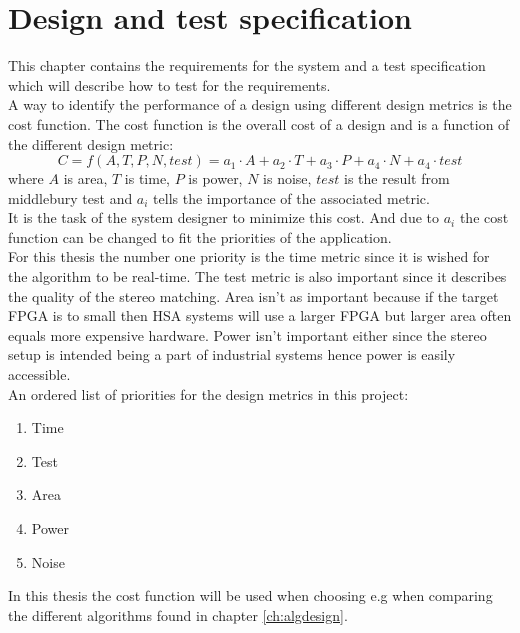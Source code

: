 \chapter{Design and test specification} \label{ch:req}
This chapter contains the requirements for the system and a test specification which will describe how to test for the requirements.\\

A way to identify the performance of a design using different design metrics is the cost function. The cost function is the overall cost of a design and is a function of the different design metric:
\begin{equation}
C = f(A,T,P,N,test) = a_1\cdot A + a_2 \cdot T + a_3 \cdot P + a_4 \cdot N + a_4 \cdot test
\end{equation}
where $A$ is area, $T$ is time, $P$ is power, $N$ is noise, $test$ is the result from middlebury test and $a_i$ tells the importance of the associated metric.\\
It is the task of the system designer to minimize this cost. And due to $a_i$ the cost function can be changed to fit the priorities of the application.\\

For this thesis the number one priority is the time metric since it is wished for the algorithm to be real-time. The test metric is also important since it describes the quality of the stereo matching. Area isn't as important because if the target FPGA is to small then HSA systems will use a larger FPGA but larger area often equals more expensive hardware. Power isn't important either since the stereo setup is intended being a part of industrial systems hence power is easily accessible.\\
An ordered list of priorities for the design metrics in this project:
\begin{enumerate}
  \item Time
  \item Test
  \item Area
  \item Power
  \item Noise
\end{enumerate}

In this thesis the cost function will be used when choosing e.g when comparing the different algorithms found in chapter \vref{ch:algdesign}. 

